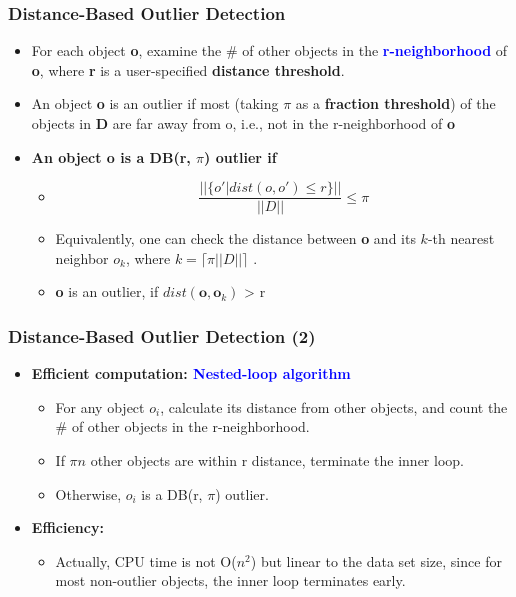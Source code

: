 \documentclass[aspectratio=169,t,xcolor=dvipsnames]{beamer}
\newcommand{\blue}[1]{\textbf{\textcolor{blue}{#1}}}
\begin{document}
%
\begin{frame}
\frametitle{Distance-Based Outlier Detection }
	\begin{itemize}
		\item For each object \textbf{o}, examine the \# of other objects in the \blue{r-neighborhood} of \textbf{o}, where \alert{\textbf{r}} is a user-specified \textbf{distance threshold}.
		\item An object \textbf{o} is an outlier if most (taking \alert{$\pi$} as a \textbf{fraction threshold}) of the objects in \alert{\textbf{D}} are far away from o, i.e., not in the r-neighborhood of \textbf{o}
	\end{itemize}
	
	\begin{itemize}
		\item \textbf{An object o is a \alert{DB(r, $\pi$) outlier} if}
		\begin{itemize}		
		\item $$\frac{||\{o'|dist(o,o')\leq r \}|| }{||D||} \leq \pi $$
		\item Equivalently, one can check the distance between \textbf{o} and its $k$-th nearest neighbor \alert{\textbf{$o_k$}}, where $k=\lceil \pi ||D||\rceil$                       . \\
		\item \textbf{o} is an outlier, if $dist(\textbf{o}, \textbf{o}_k)$ > r
	
		\end{itemize}		
		
	\end{itemize}

\end{frame}

%

\begin{frame}
	\frametitle{Distance-Based Outlier Detection (2)}
	\begin{itemize}
		\item \textbf{Efficient computation: \blue{Nested-loop algorithm}}
		      \begin{itemize}
		      	\item For any object \textbf{$o_i$}, calculate its distance from other objects, and count the \# of other objects in the r-neighborhood.
		      	\item If $\pi n $ other objects are within r distance, terminate the inner loop.
		      	\item Otherwise, \textbf{$o_i$} is a DB(r, $\pi$) outlier.
		      \end{itemize}
		\item \textbf{Efficiency:}
		      \begin{itemize}
		      	\item Actually, CPU time is not O($n^2$) but linear to the data set size, since for most non-outlier objects, the inner loop terminates early.
		      \end{itemize}
	\end{itemize}
\end{frame}
\end{document}
